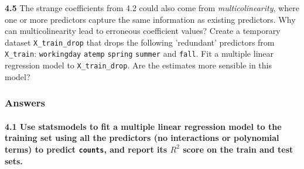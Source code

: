 \documentclass[11pt]{article}
\begin{document}
\textbf{4.5} The strange coefficients from 4.2 could also come from
\emph{multicolinearity}, where one or more predictors capture the same
information as existing predictors. Why can multicolinearity lead to
erroneous coefficient values? Create a temporary dataset
\texttt{X\_train\_drop} that drops the following 'redundant' predictors
from \texttt{X\_train}: \texttt{workingday} \texttt{atemp}
\texttt{spring} \texttt{summer} and \texttt{fall}. Fit a multiple linear
regression model to \texttt{X\_train\_drop}. Are the estimates more
sensible in this model?

    \subsubsection{Answers}\label{answers}

\paragraph{\texorpdfstring{\textbf{4.1} Use statsmodels to fit a
multiple linear regression model to the training set using all the
predictors (no interactions or polynomial terms) to predict
\texttt{counts}, and report its \(R^2\) score on the train and test
sets.}{4.1 Use statsmodels to fit a multiple linear regression model to the training set using all the predictors (no interactions or polynomial terms) to predict counts, and report its R\^{}2 score on the train and test sets.}}\label{use-statsmodels-to-fit-a-multiple-linear-regression-model-to-the-training-set-using-all-the-predictors-no-interactions-or-polynomial-terms-to-predict-counts-and-report-its-r2-score-on-the-train-and-test-sets.}
\end{document}
